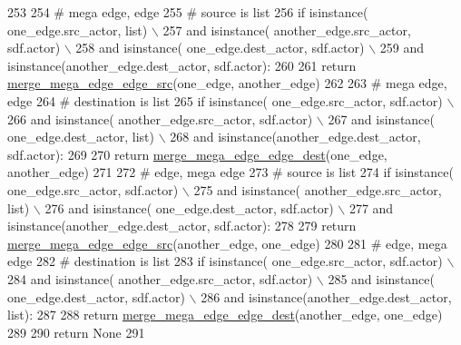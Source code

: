 \begin{DoxyCode}
253 
254             \textcolor{comment}{# mega edge, edge}
255             \textcolor{comment}{# source is list}
256             \textcolor{keywordflow}{if}  isinstance( one\_edge.src\_actor, list) \(\backslash\)
257                     \textcolor{keywordflow}{and} isinstance( another\_edge.src\_actor, sdf.actor) \(\backslash\)
258                     \textcolor{keywordflow}{and} isinstance( one\_edge.dest\_actor, sdf.actor) \(\backslash\)
259                     \textcolor{keywordflow}{and} isinstance(another\_edge.dest\_actor, sdf.actor):
260 
261                 \textcolor{keywordflow}{return} \hyperlink{namespacesylva_1_1glic_1_1glic_adaac876d9630352fd0f5e4e3350d5b30}{merge\_mega\_edge\_edge\_src}(one\_edge, another\_edge)
262 
263             \textcolor{comment}{# mega edge, edge}
264             \textcolor{comment}{# destination is list}
265             \textcolor{keywordflow}{if}  isinstance( one\_edge.src\_actor, sdf.actor) \(\backslash\)
266                     \textcolor{keywordflow}{and} isinstance( another\_edge.src\_actor, sdf.actor) \(\backslash\)
267                     \textcolor{keywordflow}{and} isinstance( one\_edge.dest\_actor, list) \(\backslash\)
268                     \textcolor{keywordflow}{and} isinstance(another\_edge.dest\_actor, sdf.actor):
269 
270                 \textcolor{keywordflow}{return} \hyperlink{namespacesylva_1_1glic_1_1glic_aaa193270639d512daa1cf9fc2f952fdb}{merge\_mega\_edge\_edge\_dest}(one\_edge, another\_edge)
271 
272             \textcolor{comment}{# edge, mega edge}
273             \textcolor{comment}{# source is list}
274             \textcolor{keywordflow}{if}  isinstance( one\_edge.src\_actor, sdf.actor) \(\backslash\)
275                     \textcolor{keywordflow}{and} isinstance( another\_edge.src\_actor, list) \(\backslash\)
276                     \textcolor{keywordflow}{and} isinstance( one\_edge.dest\_actor, sdf.actor) \(\backslash\)
277                     \textcolor{keywordflow}{and} isinstance(another\_edge.dest\_actor, sdf.actor):
278 
279                 \textcolor{keywordflow}{return} \hyperlink{namespacesylva_1_1glic_1_1glic_adaac876d9630352fd0f5e4e3350d5b30}{merge\_mega\_edge\_edge\_src}(another\_edge, one\_edge)
280 
281             \textcolor{comment}{# edge, mega edge}
282             \textcolor{comment}{# destination is list}
283             \textcolor{keywordflow}{if}  isinstance( one\_edge.src\_actor, sdf.actor) \(\backslash\)
284                     \textcolor{keywordflow}{and} isinstance( another\_edge.src\_actor, sdf.actor) \(\backslash\)
285                     \textcolor{keywordflow}{and} isinstance( one\_edge.dest\_actor, sdf.actor) \(\backslash\)
286                     \textcolor{keywordflow}{and} isinstance(another\_edge.dest\_actor, list):
287 
288                 \textcolor{keywordflow}{return} \hyperlink{namespacesylva_1_1glic_1_1glic_aaa193270639d512daa1cf9fc2f952fdb}{merge\_mega\_edge\_edge\_dest}(another\_edge, one\_edge)
289 
290         \textcolor{keywordflow}{return} \textcolor{keywordtype}{None}
291 
\end{DoxyCode}
